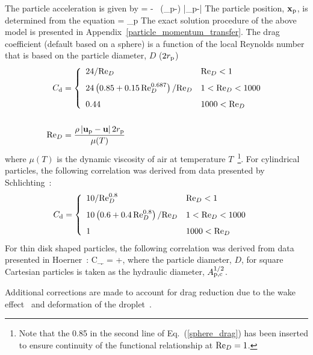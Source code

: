 The particle acceleration is given by
\be
     = \bg - \ha {} \,
    (\bu_{\rm p}-\bu) |\bu_{\rm p}-\bu|
    \label{part_accel}
\ee
The particle position, ${\mathbf{x}}_{\rm p}$, is determined from the equation
\be
     = \bu_{\rm p}
\ee
The exact solution procedure of the above model is presented in Appendix~\ref{particle_momentum_transfer}. The drag coefficient (default based on a sphere) is a function of the local Reynolds number that is based on the particle diameter, $D$ ($2 r_{\rm p}$)
\begin{align}
 C_{\rm d} &= \left\{ \begin{array}{ll}
     24/\hbox{Re}_D                                          & \hbox{Re}_D < 1    \\[0.1in]
     24\left(0.85+0.15 \, \hbox{Re}_D^{0.687} \right)/\hbox{Re}_D  & 1 < \hbox{Re}_D < 1000 \label{sphere_drag}\\[0.1in]
     0.44                                              & 1000 < \hbox{Re}_D
     \end{array} \right.  \\[0.2in]
\hbox{Re}_D &= \frac{\rho \, |{\mathbf{u}}_{\rm p}-{\mathbf{u}}| \, 2 r_{\rm p}}{\mu(T)} \end{align}
where $\mu(T)$ is the dynamic viscosity of air at temperature $T$~\cite{Crowe:1}\footnote{Note that the 0.85 in the second line of Eq.~(\ref{sphere_drag}) has been inserted to ensure continuity of the functional relationship at $\hbox{Re}_D=1$.}. For cylindrical particles, the following correlation was derived from data presented by Schlichting~\cite{Schlichting:1}:
\begin{align}
 C_{\rm d} &= \left\{ \begin{array}{ll}
     10/\hbox{Re}_D^{0.8}                                & \hbox{Re}_D < 1    \\[0.1in]
     10\left(0.6+0.4 \, \hbox{Re}_D^{0.8} \right)/\hbox{Re}_D  & 1 < \hbox{Re}_D < 1000 \\[0.1in]
     1                                             & 1000 < \hbox{Re}_D
     \end{array} \right.
\end{align}
For thin disk shaped particles, the following correlation was derived from data presented in Hoerner~\cite{Hoerner:1965}:
\be
    C_{\d} = +,
\ee
where the particle diameter, $D$, for square Cartesian particles is taken as the hydraulic diameter, $A_{\rm p,c}^{1/2}$.

Additional corrections are made to account for drag reduction due to the wake effect~\cite{Ramirez:1} and deformation of the droplet~\cite{Loth:1}.


